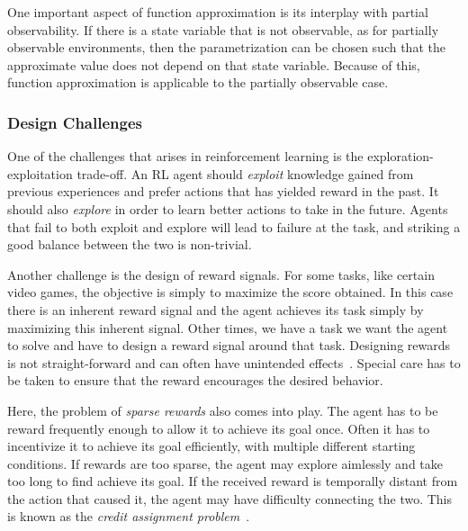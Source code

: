 One important aspect of function approximation is its interplay with partial observability.
If there is a state variable that is not observable, as for partially observable environments,
then the parametrization can be chosen such that the approximate value does not depend on that state variable.
Because of this, function approximation is applicable to the partially observable case.~\cite{sutton_reinforcement_2018}


\subsubsection{Design Challenges}


One of the challenges that arises in reinforcement learning is the exploration-exploitation trade-off.
An RL agent should \textit{exploit} knowledge gained from previous experiences and prefer actions that has yielded reward in the past.
It should also \textit{explore} in order to learn better actions to take in the future.
Agents that fail to both exploit and explore will lead to failure at the task, and striking a good balance between the two is non-trivial.~\cite{sutton_reinforcement_2018}

Another challenge is the design of reward signals.
For some tasks, like certain video games, the objective is simply to maximize the score obtained.
In this case there is an inherent reward signal and the agent achieves its task simply by maximizing this inherent signal.
Other times, we have a task we want the agent to solve and have to design a reward signal around that task.
Designing rewards is not straight-forward and can often have unintended effects~\cite{sutton_reinforcement_2018}.
Special care has to be taken to ensure that the reward encourages the desired behavior.

Here, the problem of \textit{sparse rewards} also comes into play.
The agent has to be reward frequently enough to allow it to achieve its goal once.
Often it has to incentivize it to achieve its goal efficiently, with multiple different starting conditions.
If rewards are too sparse, the agent may explore aimlessly and take too long to find achieve its goal.
If the received reward is temporally distant from the action that caused it, the agent may have difficulty connecting the two.
This is known as the \textit{credit assignment problem}~\cite{minsky_steps_1961}.


